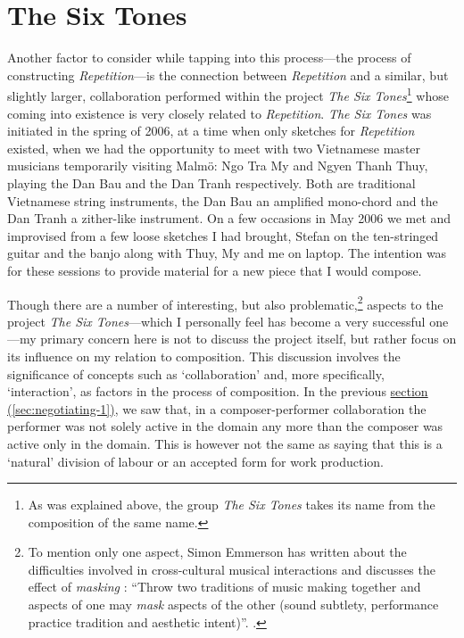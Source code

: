 \section{The Six Tones}
\label{sec:negotiating-2}

Another factor to consider while tapping into this process---the
process of constructing \emph{Repetition}---is the connection between \emph{Repetition} and a similar, but slightly larger, collaboration performed within the project \emph{The Six Tones}\footnote{As was explained above, the group \emph{The Six Tones} takes its name from the composition of the same name.} whose coming into existence is very closely related to \emph{Repetition}.
\emph{The Six Tones} was initiated in the spring of 2006, at a time when only sketches for \emph{Repetition} existed, when we had the opportunity to meet with two Vietnamese master musicians temporarily visiting Malm\"{o}: Ngo Tra My and Ngyen Thanh Thuy, playing the Dan Bau and the Dan Tranh respectively. Both are traditional Vietnamese string instruments, the Dan Bau an amplified mono-chord and the Dan Tranh a zither-like instrument. On a few occasions in May 2006 we met and improvised from a few loose sketches I had brought, Stefan on the ten-stringed guitar and the banjo along with Thuy, My and me on laptop. The intention was for these sessions to provide material for a new piece that I would compose.

\label{sec:2-par:2}
Though there are a number of interesting, but also problematic,\footnote{To mention only one aspect, Simon Emmerson has written about the difficulties involved in cross-cultural musical interactions and discusses the effect of \emph{masking} : ``Throw two traditions of music making together and aspects of one may \emph{mask} aspects of the other (sound subtlety, performance practice tradition and aesthetic intent)''. \cite{emmerson06}.} aspects to the project \emph{The Six Tones}---which I personally feel has become a very successful one---my primary concern here is not to discuss the project itself, but rather focus on its influence on my relation to composition. This discussion involves the significance of concepts such as `collaboration' and, more specifically, `interaction', as factors in the process of composition. In the previous \hyperref[sec:negotiating-1]{section (\ref*{sec:negotiating-1})}, we saw that, in a composer-performer collaboration the performer was not solely active in the  domain any more than the composer was active only in the  domain. This is however not the same as saying that this is a `natural' division of labour or an accepted form for work production.

